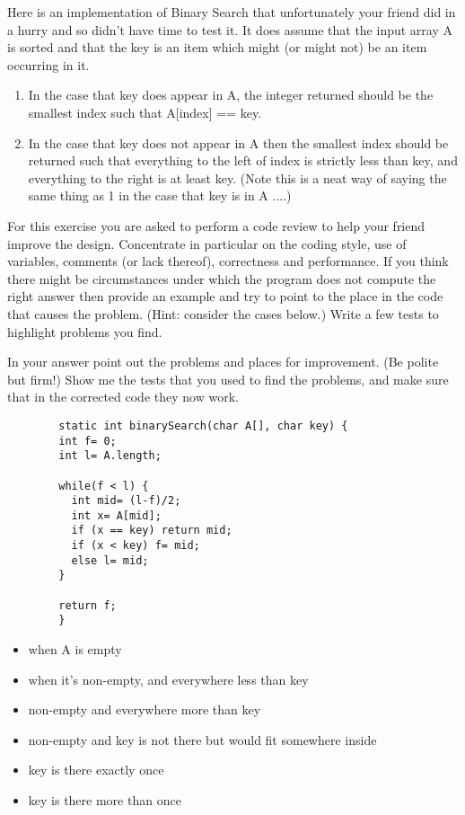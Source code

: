 \item 
    Here is an implementation of Binary Search that unfortunately your friend did in a hurry and so didn't have time to test it. It does assume that the input array A is sorted and that the key is an item which might (or might not) be an item occurring in it.
    
    \begin{enumerate}
    \item In the case that key does appear in A, the integer returned should be the smallest index such that A[index] == key.
    
    \item In the case that key does not appear in A then the smallest index should be returned such that everything to the left of index is strictly less than key, and everything to the right is at least key. (Note this is a neat way of saying the same thing as 1 in the case that key is in A ....)
    \end{enumerate}
    
    
    For this exercise you are asked to perform a code review to help your friend improve the design. Concentrate in particular on the coding style, use of variables, comments (or lack thereof), correctness and performance. If you think there might be circumstances under which the program does not compute the right answer then provide an example and try to point to the place in the code that causes the problem. (Hint: consider the cases below.) Write a few tests to highlight problems you find.
    
    In your answer point out the problems and places for improvement. (Be polite but firm!) 
    Show me the tests that you used to find the problems, and make sure that in the corrected code they now work.
    
    
    
    \begin{verbatim}
        static int binarySearch(char A[], char key) {
        int f= 0;
        int l= A.length;
         
        while(f < l) {
          int mid= (l-f)/2;
          int x= A[mid];
          if (x == key) return mid;
          if (x < key) f= mid;
          else l= mid;
        }
         
        return f;
        }
    \end{verbatim}
    \begin{itemize}
    \item when A is empty
    \item when it's non-empty, and everywhere less than key
    \item non-empty and everywhere more than key
    \item non-empty and key is not there but would fit somewhere inside
    \item key is there exactly once
    \item key is there more than once
    \end{itemize}